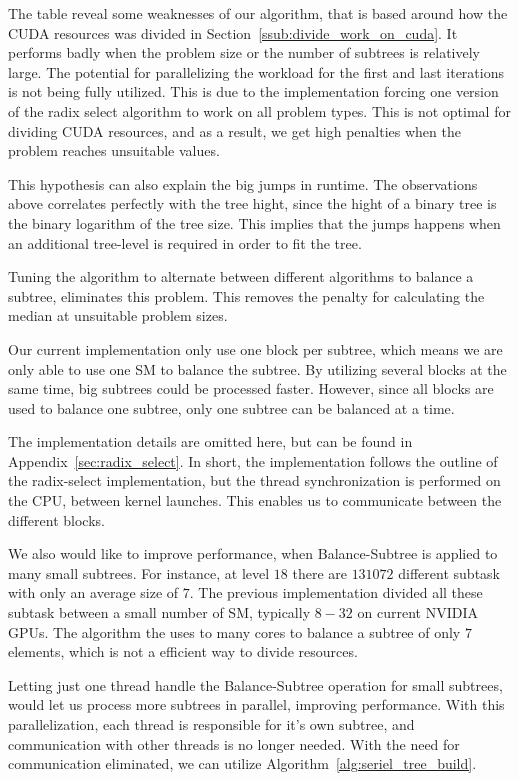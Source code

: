 The table reveal some weaknesses of our algorithm, that is based around how the CUDA resources was divided in Section~\ref{ssub:divide_work_on_cuda}. It performs badly when the problem size or the number of subtrees is relatively large. The potential for parallelizing the workload for the first and last iterations is not being fully utilized. This is due to the implementation forcing one version of the radix select algorithm to work on all problem types. This is not optimal for dividing CUDA resources, and as a result, we get high penalties when the problem reaches unsuitable values.

This hypothesis can also explain the big jumps in runtime. The observations above correlates perfectly with the tree hight, since the hight of a binary tree is the binary logarithm of the tree size. This implies that the jumps happens when an additional tree-level is required in order to fit the tree.

Tuning the algorithm to alternate between different algorithms to balance a subtree, eliminates this problem. This removes the penalty for calculating the median at unsuitable problem sizes.

Our current implementation only use one block per subtree, which means we are only able to use one SM to balance the subtree. By utilizing several blocks at the same time, big subtrees could be processed faster. However, since all blocks are used to balance one subtree, only one subtree can be balanced at a time.

The implementation details are omitted here, but can be found in Appendix~\ref{sec:radix_select}. In short, the implementation follows the outline of the radix-select implementation, but the thread synchronization is performed on the CPU, between kernel launches. This enables us to communicate between the different blocks.

We also would like to improve performance, when Balance-Subtree is applied to many small subtrees. For instance, at level $18$ there are $131072$ different subtask with only an average size of $7$. The previous implementation divided all these subtask between a small number of SM, typically $8-32$ on current NVIDIA GPUs\@. The algorithm the uses to many cores to balance a subtree of only $7$ elements, which is not a efficient way to divide resources.

Letting just one thread handle the Balance-Subtree operation for small subtrees, would let us process more subtrees in parallel, improving performance. With this parallelization, each thread is responsible for it's own subtree, and communication with other threads is no longer needed. With the need for communication eliminated, we can utilize Algorithm~\ref{alg:seriel_tree_build}. 

